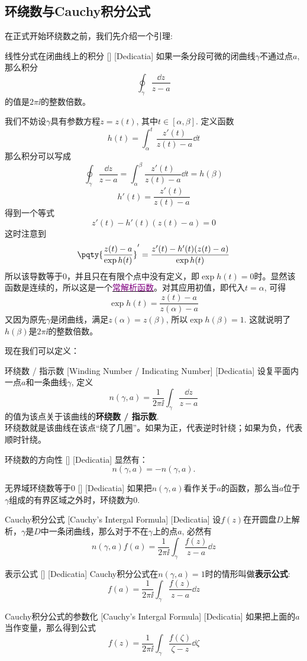 \documentclass[UTF8]{ctexart}
\newcommand{\hyperrefc}[2]{\hyperref[#1]{\textcolor{purple}{#2}}}
\begin{document}
\subsection{环绕数与Cauchy积分公式}
在正式开始环绕数之前，我们先介绍一个引理:
\begin{lma}
    [UUID]
    {线性分式在闭曲线上的积分}
    []
    [Dedicatia]
    如果一条分段可微的闭曲线$\gamma$不通过点$a$, 那么积分
    \[\oint_\gamma\frac{\dd{z}}{z-a} \]
    的值是$2\pi\ii$的整数倍数。
\end{lma}
\begin{prf}
    我们不妨设$\gamma$具有参数方程$z=z(t)$, 其中$t\in[\alpha,\beta]$. 定义函数
    \[h(t)=\int_\alpha^t \frac{z'(t)}{z(t)-a}\dd{t}\]
    那么积分可以写成
    \[\oint_\gamma\frac{\dd{z}}{z-a}=\int_\alpha^\beta \frac{z'(t)}{z(t)-a}\dd{t}=h(\beta)\]
    \[h'(t)=\frac{z'(t)}{z(t)-a}\]
    得到一个等式
    \[z'(t)-h'(t)(z(t)-a)=0\]
    这时注意到
    \[\pqty{\frac{z(t)-a}{\exp h(t)}}'=\frac{z'(t)-h'(t)(z(t)-a)}{\exp h(t)}\]
    所以该导数等于0，并且只在有限个点中没有定义，即$\exp h(t)=0$时。显然该函数是连续的，所以这是一个\hyperrefc{dfn:TrivialAnalyticalFunction}{常解析函数}。对其应用初值，即代入$t=\alpha$, 可得
    \[\exp h(t)=\frac{z(t)-a}{z(\alpha)-a}\]
    又因为原先$\gamma$是闭曲线，满足$z(\alpha)=z(\beta)$, 所以$\exp h(\beta)=1$. 这就说明了$h(\beta)$是$2\pi\ii$的整数倍数。
\end{prf}
现在我们可以定义：
\begin{dfn}
    [WindingNumber]
    {环绕数 / 指示数}
    [Winding Number / Indicating Number]
    [Dedicatia]
    设复平面内一点$a$和一条曲线$\gamma$, 定义
    \[n(\gamma, a)=\frac{1}{2\pi\ii}\int_\gamma\frac{\dd{z}}{z-a}\]
    的值为该点关于该曲线的\textbf{环绕数 / 指示数}.\\
    环绕数就是该曲线在该点“绕了几圈”。如果为正，代表逆时针绕；如果为负，代表顺时针绕。
\end{dfn}
\begin{ppt}
    [UUID]
    {环绕数的方向性}
    []
    [Dedicatia]
    显然有：
    \[n(\gamma,a)=-n(\gamma,a).\]
\end{ppt}
\begin{ppt}
    [UUID]
    {无界域环绕数等于0}
    []
    [Dedicatia]
    如果把$n(\gamma,a)$看作关于$a$的函数，那么当$a$位于$\gamma$组成的有界区域之外时，环绕数为0.
\end{ppt}
\begin{thm}
    [UUID]
    {Cauchy积分公式}
    [Cauchy's Intergal Formula]
    [Dedicatia]
    设$f(z)$在开圆盘$D$上解析，$\gamma$是$D$中一条闭曲线，那么对于不在$\gamma$上的点$a$, 必然有
    \[n(\gamma,a)f(a)=\frac{1}{2\pi\ii}\int_\gamma\frac{f(z)}{z-a}\dd{z} \]
\end{thm}
\begin{crl}
    [CauchyRepresenting]
    {表示公式}
    []
    [Dedicatia]
    Cauchy积分公式在$n(\gamma,a)=1$时的情形叫做\textbf{表示公式}:
    \[f(a)=\frac{1}{2\pi\ii}\int_\gamma\frac{f(z)}{z-a}\dd{z}\]
\end{crl}
\begin{crl}
    [UUID]
    {Cauchy积分公式的参数化}
    [Cauchy's Intergal Formula]
    [Dedicatia]
    如果把上面的$a$当作变量，那么得到公式
    \[f(z)=\frac{1}{2\pi\ii}\int_\gamma\frac{f(\zeta)}{\zeta-z}\dd{\zeta}\]
\end{crl}
\end{document}
